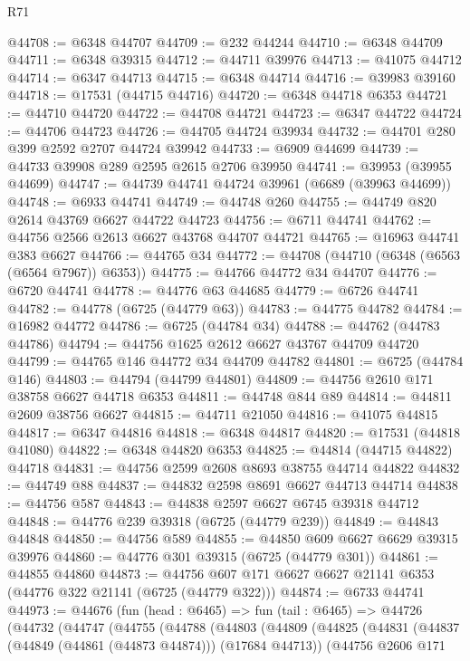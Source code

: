 \begin{lexlean}{R71}
\begin{coremodule}
@44708 := @6348 @44707
@44709 := @232 @44244
@44710 := @6348 @44709
@44711 := @6348 @39315
@44712 := @44711 @39976
@44713 := @41075 @44712
@44714 := @6347 @44713
@44715 := @6348 @44714
@44716 := @39983 @39160
@44718 := @17531 (@44715 @44716)
@44720 := @6348 @44718 @6353
@44721 := @44710 @44720
@44722 := @44708 @44721
@44723 := @6347 @44722
@44724 := @44706 @44723
@44726 := @44705 @44724 @39934
@44732 := @44701 @280 @399 @2592 @2707 @44724 @39942
@44733 := @6909 @44699
@44739 := @44733 @39908 @289 @2595 @2615 @2706 @39950
@44741 := @39953 (@39955 @44699)
@44747 := @44739 @44741 @44724 @39961 (@6689 (@39963 @44699))
@44748 := @6933 @44741
@44749 := @44748 @260
@44755 := @44749 @820 @2614 @43769 @6627 @44722 @44723
@44756 := @6711 @44741
@44762 := @44756 @2566 @2613 @6627 @43768 @44707 @44721
@44765 := @16963 @44741 @383 @6627
@44766 := @44765 @34
@44772 := @44708 (@44710 (@6348 (@6563 (@6564 @7967)) @6353))
@44775 := @44766 @44772 @34 @44707
@44776 := @6720 @44741
@44778 := @44776 @63 @44685
@44779 := @6726 @44741
@44782 := @44778 (@6725 (@44779 @63))
@44783 := @44775 @44782
@44784 := @16982 @44772
@44786 := @6725 (@44784 @34)
@44788 := @44762 (@44783 @44786)
@44794 := @44756 @1625 @2612 @6627 @43767 @44709 @44720
@44799 := @44765 @146 @44772 @34 @44709 @44782
@44801 := @6725 (@44784 @146)
@44803 := @44794 (@44799 @44801)
@44809 := @44756 @2610 @171 @38758 @6627 @44718 @6353
@44811 := @44748 @844 @89
@44814 := @44811 @2609 @38756 @6627
@44815 := @44711 @21050
@44816 := @41075 @44815
@44817 := @6347 @44816
@44818 := @6348 @44817
@44820 := @17531 (@44818 @41080)
@44822 := @6348 @44820 @6353
@44825 := @44814 (@44715 @44822) @44718
@44831 := @44756 @2599 @2608 @8693 @38755 @44714 @44822
@44832 := @44749 @88
@44837 := @44832 @2598 @8691 @6627 @44713 @44714
@44838 := @44756 @587
@44843 := @44838 @2597 @6627 @6745 @39318 @44712
@44848 := @44776 @239 @39318 (@6725 (@44779 @239))
@44849 := @44843 @44848
@44850 := @44756 @589
@44855 := @44850 @609 @6627 @6629 @39315 @39976
@44860 := @44776 @301 @39315 (@6725 (@44779 @301))
@44861 := @44855 @44860
@44873 := @44756 @607 @171 @6627 @6627 @21141 @6353 (@44776 @322 @21141 (@6725 (@44779 @322)))
@44874 := @6733 @44741
@44973 := @44676
    (fun (head : @6465) =>
    fun (tail : @6465) =>
    @44726
      (@44732
        (@44747
          (@44755
            (@44788
              (@44803
                (@44809
                  (@44825
                    (@44831
                      (@44837 (@44849 (@44861 (@44873 @44874))) (@17684 @44713))
                      (@44756
                        @2606
                        @171

\end{coremodule}
\end{lexlean}
